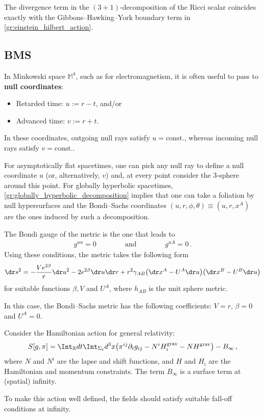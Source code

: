     \begin{property}
        The divergence term in the $(3+1)$-decomposition of the Ricci scalar coincides exactly with the Gibbons--Hawking--York boundary term in \cref{gr:einstein_hilbert_action}.
    \end{property}

\subsection{BMS}

    In Minkowski space $\mathbb{M}^4$, such as for electromagnetism, it is often useful to pass to \textbf{null coordinates}:
    \begin{itemize}
        \item Retarded time: $u:=r-t$, and/or
        \item Advanced time: $v:=r+t$.
    \end{itemize}
    In these coordinates, outgoing null rays satisfy $u=\text{const.}$, whereas incoming null rays satisfy $v=\text{const.}$.

    For asymptotically flat spacetimes, one can pick any null ray to define a null coordinate $u$ (or, alternatively, $v$) and, at every point consider the 3-sphere around this point. For globally hyperbolic spacetimes, \cref{gr:globally_hyperbolic_decomposition} implies that one can take a foliation by null hypersurfaces and the Bondi--Sachs coordinates $(u,r,\phi,\theta)\equiv(u,r,x^A)$ are the ones induced by such a decomposition.

    The Bondi gauge of the metric is the one that leads to
    \begin{gather*}
        g^{uu}=0\qquad\qquad\text{and}\qquad\qquad g^{uA}=0\,.
    \end{gather*}
    Using these conditions, the metric takes the following form
    \begin{gather*}
        \dr s^2 = -\frac{Ve^{2\beta}}{r}\dr u^2-2e^{2\beta}\dr u\dr r+r^2\gamma_{AB}\bigl(\dr x^A-U^A\dr u\bigr)\bigl(\dr x^B-U^B\dr u\bigr)
    \end{gather*}
    for suitable functions $\beta,V$ and $U^A$, where $h_{AB}$ is the unit sphere metric.

    \begin{example}
        In this case, the Bondi--Sachs metric has the following coefficients:
        $V=r$, $\beta=0$ and $U^A=0$.
    \end{example}


    Consider the Hamiltonian action for general relativity:
    \begin{gather*}
        S[g,\pi] = \Int_{\mathbb{R}}dt\Int_{\Sigma_t}d^3x\bigl(\pi^{ij}\partial_tg_{ij}-N^iH_i^{\text{grav}}-NH^{\text{grav}}\bigr)-B_\infty\,,
    \end{gather*}
    where $N$ and $N^i$ are the lapse and shift functions, and $H$ and $H_i$ are the Hamiltonian and momentum constraints. The term $B_\infty$ is a surface term at (spatial) infinity.

    To make this action well defined, the fields should satisfy suitable fall-off conditions at infinity.
